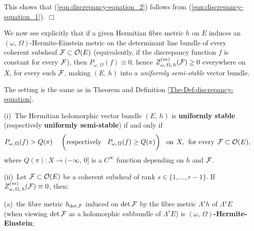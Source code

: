 \documentclass[12pt]{article}
\begin{document}
This shows that (\ref{eqn:discrepancy-equation_2}) follows from (\ref{eqn:discrepancy-equation_1}). \hfill $\Box$

\vspace{2ex}

We now see explicitly that if a given Hermitian fibre metric $h$ on $E$ induces an $(\omega,\,\Omega)$-Hermite-Einstein metric on the determinant line bundle of every coherent subsheaf ${\cal F}\subset{\cal O}(E)$ (equivalently, if the discrepancy function $f$ is constant for every ${\cal F}$), then $P_{\omega,\,\Omega}(f)\equiv 0$, hence $Z_{\omega,\,\Omega,\,h}^{(m)}({\cal F})\geq 0$ everywhere on $X$, for every such ${\cal F}$, making $(E,\,h)$ into a {\it uniformly semi-stable} vector bundle.


\begin{Cor}\label{Cor:discrepancy-equation} The setting is the same as in Theorem and Definition \ref{The-Def:discrepancy-equation}.

\vspace{1ex}  

 (i)\, The Hermitian holomorphic vector bundle $(E,\,h)$ is {\bf uniformly stable} (respectively {\bf uniformly semi-stable}) if and only if \begin{eqnarray}\label{eqn:discrepancy-inequality}P_{\omega,\,\Omega}(f) > Q(\pi)  \hspace{3ex} \bigg(\mbox{respectively} \hspace{2ex} P_{\omega,\,\Omega}(f) \geq Q(\pi)\bigg) \hspace{2ex} \mbox{on} \hspace{1ex} X, \hspace{1ex} \mbox{for every} \hspace{1ex} {\cal F}\subset{\cal O}(E),\end{eqnarray} where $Q(\pi):X\longrightarrow(-\infty,\, 0]$ is a $C^\infty$ function depending on $h$ and ${\cal F}$.

\vspace{1ex}  

 (ii)\, Let ${\cal F}\subset{\cal O}(E)$ be a coherent subsheaf of rank $s\in\{1,\dots , r-1\}$. If $Z_{\omega,\,\Omega,\,h}^{(m)}({\cal F})\equiv 0$, then:

\vspace{1ex}  

\hspace{2ex} (a)\, the fibre metric $h_{\det{\cal F}}$ induced on $\det{\cal F}$ by the fibre metric $\Lambda^sh$ of $\Lambda^sE$ (when viewing $\det{\cal F}$ as a holomorphic subbundle of $\Lambda^sE$) is {\bf $(\omega,\,\Omega)$-Hermite-Einstein};


\end{Cor}
\end{document}
